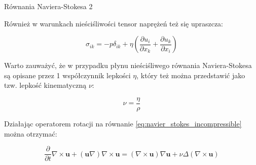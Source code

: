 \documentclass{beamer}
\begin{document}
\begin{frame}{Równania Naviera-Stokesa 2}

	Również w warunkach nieściśliwości tensor naprężeń też się upraszcza:

	\begin{equation}
		\sigma_{ik} = -p\delta_{ik} + \eta \left( \frac{\partial u_i}{\partial x_k} +
		\frac{\partial u_k}{\partial x_i} \right)
		\label{eq:stress_tensor_incompressible}
	\end{equation}

	Warto zauważyć, że w przypadku płynu nieściśliwego równania Naviera-Stokesa
	są opisane przez 1 współczynnik lepkości $\eta$, który też można 
	przedstawić jako tzw. lepkość kinematyczną $\nu$:

	\begin{equation}
		\nu = \frac{\eta}{\rho}
		\label{eq:kin_visc_def}
	\end{equation}

	Działając operatorem rotacji na równanie
	\eqref{eq:navier_stokes_incompressible} można otrzymać:

	\begin{equation}
		\frac{\partial}{\partial t}\nabla \times \textbf{u} +
		(\textbf{u}\nabla) \nabla \times \textbf{u} =
		(\nabla \times \textbf{u})\nabla \textbf{u} +
		\nu \Delta (\nabla \times \textbf{u})
		\label{eq:vorticity_equation}
	\end{equation}
	
\end{frame}
\end{document}
